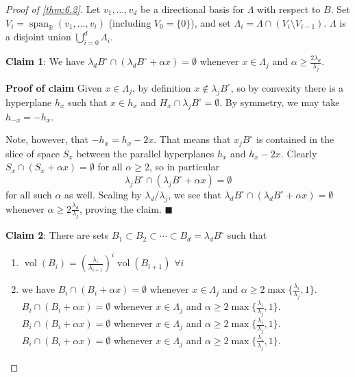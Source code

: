 \documentclass{article}
\DeclareMathOperator{\spn}{span}
\DeclareMathOperator{\vol}{vol}
\numberwithin{equation}{section}
\begin{document}
\begin{proof}[Proof of \cref{thm:6.2}]
  Let $v_1, \dotsc, v_d$ be a directional basis for $\Lambda$ with respect to $B$. Set $V_i = \spn_\mathbb{R}(v_1, \dotsc, v_i)$ (including $V_0 = \{0\}$), and set $\Lambda_i = \Lambda \cap (V_i \setminus V_{i-1})$.
  $\Lambda$ is a disjoint union $\bigcup_{i=0}^d \Lambda_i$.

  \textbf{Claim 1}: We have $\lambda_d B^\circ \cap (\lambda_d B^\circ + \alpha x) = \emptyset$ whenever $x \in \Lambda_j$ and $\alpha \geq \frac{2\lambda_d}{\lambda_j}$.

  \textbf{Proof of claim} Given $x \in \Lambda_j$, by definition $x \notin \lambda_j B^\circ$, so by convexity there is a hyperplane $h_x$ such that $x \in h_x$ and $H_x \cap \lambda_j B^\circ = \emptyset$.
  By symmetry, we may take $h_{-x} = -h_x$.
  \begin{center}
  \end{center}
  Note, however, that $-h_x = h_x - 2x$. That means that $x_j B^\circ$ is contained in the slice of space $S_x$ between the parallel hyperplanes $h_x$ and $h_x - 2x$. Clearly $S_x \cap (S_x + \alpha x) = \emptyset$ for all $\alpha \geq 2$, so in particular
  \begin{equation*}
    \lambda_jB^\circ \cap (\lambda_j B^\circ + \alpha x) = \emptyset
  \end{equation*}
  for all such $\alpha$ as well. Scaling by $\lambda_d/\lambda_j$, we see that $\lambda_d B^\circ \cap (\lambda_d B^\circ + \alpha x) = \emptyset$ whenever $\alpha \geq 2 \frac{\lambda_d}{\lambda_j}$, proving the claim. $\blacksquare$

  \textbf{Claim 2}: There are sets $B_1 \subset B_2 \subset \dotsb \subset B_d = \lambda_d B^\circ$ such that
  \begin{enumerate}
    \item $\vol(B_i) = (\frac{\lambda_i}{\lambda_{i+1}})^i \vol(B_{i+1})$ $\forall i$
    \item we have $B_i \cap (B_i + \alpha x) = \emptyset$ whenever $x \in \Lambda_j$ and $\alpha \geq 2 \max\{\frac{\lambda_i}{\lambda_j}, 1\}$. $B_i \cap (B_i + \alpha x) = \emptyset$ whenever $x \in \Lambda_j$ and $\alpha \geq 2 \max\{\frac{\lambda_i}{\lambda_j}, 1\}$. $B_i \cap (B_i + \alpha x) = \emptyset$ whenever $x \in \Lambda_j$ and $\alpha \geq 2 \max\{\frac{\lambda_i}{\lambda_j}, 1\}$. $B_i \cap (B_i + \alpha x) = \emptyset$ whenever $x \in \Lambda_j$ and $\alpha \geq 2 \max\{\frac{\lambda_i}{\lambda_j}, 1\}$.
  \end{enumerate}


\end{proof}
\end{document}
